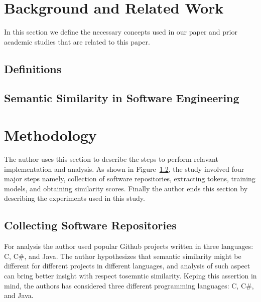 \documentclass[conference]{IEEEtran}
\begin{document}
\section{Background and Related Work}
\label{related}

In this section we define the necessary concepts used in our paper and prior academic studies that are related to this paper.

\subsection{Definitions}



\subsection{Semantic Similarity in Software Engineering}






\section{Methodology}
\label{meth}

The author uses this section to describe the steps to perform relavant implementation and analysis. As shown in Figure~\ref{}, the study involved four major steps namely, collection of software repositories, extracting tokens, training models, and obtaining similarity scores. Finally the author ends this section by describing the experiments used in this study.    

\subsection{Collecting Software Repositories}
\label{proj_collect}

For analysis the author used popular Github projects written in three languages: C, C\#, and Java. The author hypothesizes that semantic similarity might be different for different projects in different languages, and analysis of such aspect can bring better insight with respect tosemntic similarity. Keping this assertion in mind, the authors has considered three different programming languages: C, C\#, and Java. 
\end{document}
